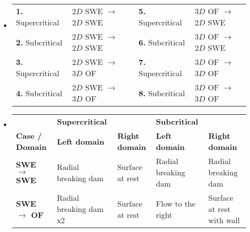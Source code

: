 
\begin{frame}
\begin{itemize}
\item<1->[]
\begin{tcolorbox}[title= \textbf{Domain Mapping},colframe=TUMDarkBlue] 
\begin{table}[]
\begin{tabular}{llp{2cm}ll}
\textbf{1.} Supercritical & $2D$ SWE  $\rightarrow$  $2D$  SWE  & & \textbf{5.} Supercritical & $3D$ OF   $\rightarrow$  $2D$ SWE  \\ 
\textbf{2.} Subcritical   & $2D$ SWE  $\rightarrow$  $2D$  SWE & & \textbf{6.} Subcritical   & $3D$ OF   $\rightarrow$  $2D$ SWE     \\[0.2cm]
\textbf{3.} Supercritical & $2D$ SWE  $\rightarrow$  $3D$  OF   & & \textbf{7.} Supercritical & $3D$ OF   $\rightarrow$  $3D$ OF    \\ 
\textbf{4.} Subcritical   & $2D$ SWE  $\rightarrow$  $3D$  OF & & \textbf{8.} Subcritical   & $3D$ OF   $\rightarrow$  $3D$ OF
\end{tabular}
\end{table}
\end{tcolorbox}
\vspace{0.5cm}
\item<2->[]
\begin{tcolorbox}[title= \textbf{Scenarios}, colframe=TUMDarkBlue] 
\begin{table}[!h]
\centering
\begin{tabular}{l|ll|ll}
 & {\large \textbf{Supercritical}} & & {\large \textbf{Subcritical}} &\\[0.3cm]
\textbf{Case / Domain} & \textbf{Left domain} & \textbf{Right domain} & \textbf{Left domain} & \textbf{Right domain}\\[0.3cm]
\textbf{SWE $\rightarrow$ SWE} & Radial breaking dam      & Surface at rest   & Radial breaking dam      & Radial breaking dam     \\[0.1cm]
\textbf{SWE $\rightarrow$ OF}  & Radial breaking dam x2   & Surface at rest & Flow to the right & Surface at rest with wall     \\[0.1cm]

\end{tabular}
\end{table}
\end{tcolorbox}
\end{itemize}
\end{frame}
